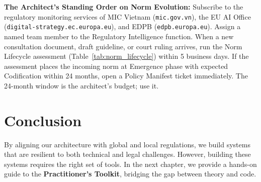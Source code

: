 \begin{svgraybox}
\textbf{The Architect's Standing Order on Norm Evolution:} Subscribe to the regulatory monitoring services of MIC Vietnam (\texttt{mic.gov.vn}), the EU AI Office (\texttt{digital-strategy.ec.europa.eu}), and EDPB (\texttt{edpb.europa.eu}). Assign a named team member to the Regulatory Intelligence function. When a new consultation document, draft guideline, or court ruling arrives, run the Norm Lifecycle assessment (Table~\ref{tab:norm_lifecycle}) within 5 business days. If the assessment places the incoming norm at Emergence phase with expected Codification within 24 months, open a Policy Manifest ticket immediately. The 24-month window is the architect's budget; use it.
\end{svgraybox}

\section{Conclusion}
\label{sec:conclusion_compliance}

By aligning our architecture with global and local regulations, we build systems that are resilient to both technical and legal challenges. However, building these systems requires the right set of tools. In the next chapter, we provide a hands-on guide to the \textbf{Practitioner's Toolkit}, bridging the gap between theory and code.


